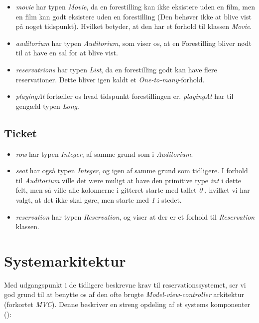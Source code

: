 \begin{itemize}
  \item \textit{movie} har typen \textit{Movie}, da en forestilling kan ikke eksistere uden en film, men en film kan godt eksistere uden en forestilling (Den behøver ikke at blive vist på noget tidspunkt). Hvilket betyder, at den har et forhold til klassen \textit{Movie}.
  \item \textit{auditorium} har typen \textit{Auditorium}, som viser os, at en Forestilling bliver nødt til at have en sal for at blive vist. 
  \item \textit{reservatrions} har typen \textit{List}, da en forestilling godt kan have flere reservationer. Dette bliver igen kaldt et \textit{One-to-many}-forhold.
  \item \textit{playingAt} fortæller os hvad tidspunkt forestillingen er. \textit{playingAt} har til gengæld typen \textit{Long}. 
\end{itemize}

\subsection{Ticket}

\begin{itemize}
  \item \textit{row} har typen \textit{Integer}, af samme grund som i \textit{Auditorium}.
  \item \textit{seat} har også typen \textit{Integer}, og igen af samme grund som tidligere. I forhold til \textit{Auditorium} ville det være muligt at have den primitive type \textit{int} i dette felt, men så ville alle kolonnerne i gitteret starte med tallet \textit{0} , hvilket vi har valgt, at det ikke skal gøre, men starte med \textit{1} i stedet.
  \item \textit{reservation} har typen \textit{Reservation}, og viser at der er et forhold til \textit{Reservation} klassen.
\end{itemize}

\section{Systemarkitektur}

Med udgangspunkt i de tidligere beskrevne krav til reservationssystemet, ser vi god grund til at benytte os af den ofte brugte \textit{Model-view-controller} arkitektur (forkortet \textit{MVC}). Denne beskriver en streng opdeling af et systems komponenter (\cite{wiki:mvc}):

